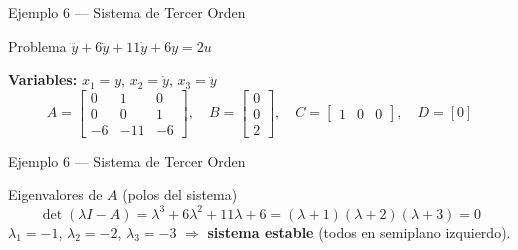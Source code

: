 \documentclass[aspectratio=169,xcolor=dvipsnames]{beamer}
\begin{document}
\begin{frame}{Ejemplo 6 --- Sistema de Tercer Orden}
    \begin{exampleblock}{Problema}
        $\dddot{y} + 6\ddot{y} + 11\dot{y} + 6y = 2u$
    \end{exampleblock}
    \vspace{0.2em}
    \textbf{Variables:} $x_1 = y$, $x_2 = \dot{y}$, $x_3 = \ddot{y}$
    \begin{equation}
        A = \begin{bmatrix} 0 & 1 & 0 \\ 0 & 0 & 1 \\ -6 & -11 & -6 \end{bmatrix}, \quad
        B = \begin{bmatrix} 0 \\ 0 \\ 2 \end{bmatrix}, \quad
        C = \begin{bmatrix} 1 & 0 & 0 \end{bmatrix}, \quad D = [0]
    \end{equation}
\end{frame}
\begin{frame}{Ejemplo 6 --- Sistema de Tercer Orden}
    \begin{block}{Eigenvalores de $A$ (polos del sistema)}
        \[
            \det(\lambda I - A) = \lambda^3 + 6\lambda^2 + 11\lambda + 6 = (\lambda+1)(\lambda+2)(\lambda+3) = 0
        \]
        $\lambda_1 = -1$, \; $\lambda_2 = -2$, \; $\lambda_3 = -3$ \quad $\Rightarrow$ \textbf{sistema estable} (todos en semiplano izquierdo).
    \end{block}
\end{frame}
\end{document}
